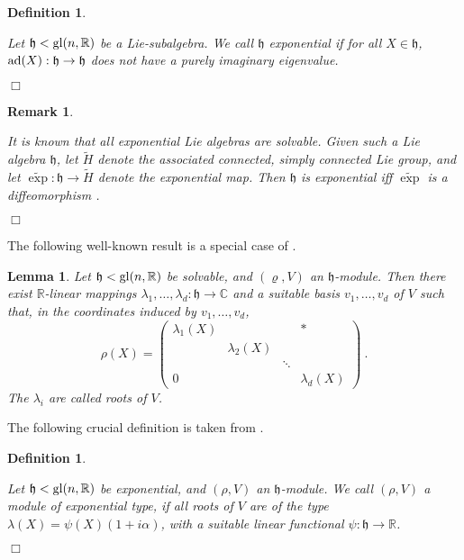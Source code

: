 \documentclass[12pt]{amsart}
\newtheorem{lemma}[thm]{Lemma}
\newtheorem{Defn}[thm]{Definition}
\newtheorem{Rem}[thm]{Remark}
\newenvironment{defn}
 {\begin{Defn} \begin{rm}} {\end{rm} \hfill $\Box$ \end{Defn}}
\newenvironment{rem}
 {\begin{Rem} \begin{rm}} {\end{rm} \hfill $\Box$ \end{Rem}}
\begin{document}
\begin{defn}
 Let $\mathfrak{h}< {\rm gl}(n,\mathbb{R})$ be a Lie-subalgebra. We call $\mathfrak{h}$ {\em exponential} if for all $X \in \mathfrak{h}$, ${\rm ad}(X):\mathfrak{h} \to \mathfrak{h}$ does not have a purely imaginary eigenvalue.
\end{defn}

\begin{rem}
 It is known that all exponential Lie algebras are solvable. Given such a Lie algebra $\mathfrak{h}$, let $\widetilde{H}$ denote the associated connected, simply connected Lie group, and let $\widetilde{\exp}: \mathfrak{h} \to \widetilde{H}$ denote the exponential map.  Then $\mathfrak{h}$ is exponential iff $\widetilde{\exp}$ is a diffeomorphism \cite{Bernatetal}.
\end{rem}

The following well-known result is a special case of \cite[Theorem 3.7.3]{Var}.
\begin{lemma}
 Let $\mathfrak{h}<{\rm gl}(n,\mathbb{R})$ be solvable, and $(\varrho,V)$ an $\mathfrak{h}$-module. Then there exist $\mathbb{R}$-linear mappings $\lambda_1,\ldots,\lambda_d : \mathfrak{h} \to \mathbb{C}$ and a suitable basis $v_1,\ldots,v_d$ of $V$ such that, in the coordinates induced by $v_1,\ldots,v_d$,
\begin{equation}
 \label{eqn:tridiag_solv}
 \rho(X) = \left( \begin{array}{cccc} \lambda_1(X) &  & & \ast \\   & \lambda_2(X) &  & \\   &  & \ddots & \\ 0  &  &  & \lambda_d(X) \end{array} \right)~.
\end{equation}
The $\lambda_i$ are called {\em roots} of $V$.
\end{lemma}

The following crucial definition is taken from \cite{Bernatetal}.
\begin{defn}
 Let $\mathfrak{h}< {\rm gl}(n,\mathbb{R})$ be exponential, and $(\rho,V)$ an $\mathfrak{h}$-module. We call $(\rho,V)$ a
module of exponential type, if all roots of $V$ are of the type $\lambda(X) = \psi(X) (1+i\alpha)$, with a suitable linear functional $\psi:\mathfrak{h} \to \mathbb{R}$.
\end{defn}
\end{document}
